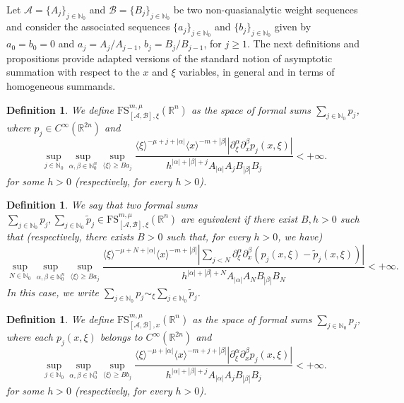 \documentclass[11pt,reqno]{amsart}
\numberwithin{equation}{section}
\newtheorem{definition}[theorem]{Definition}
\newcommand{\R}{{\mathbb{R}}} %
\newcommand{\N}{{\mathbb{N}}} %
\newcommand{\FS}{{\mathrm{FS}}}
\newcommand{\Aj}{{\{A_j\}_{j\in\mathbb{N}_0}}} %
\newcommand{\Bj}{{\{B_j\}_{j\in\mathbb{N}_0}}} %
\newcommand{\A}{{\mathcal{A}}} %
\newcommand{\B}{{\mathcal{B}}} %
\begin{document}
Let $\A=\Aj$ and $\B=\Bj$ be two non-quasianalytic weight sequences and consider the associated sequences $\{a_j\}_{j\in\N_0}$ and $\{b_j\}_{j\in\N_0}$ given by $a_0=b_0=0$ and $a_j=A_j/A_{j-1}$, $b_j=B_j/B_{j-1}$, for $j\geq 1$. The next definitions and propositions
provide adapted versions of the standard notion of asymptotic summation with respect to the $x$ and $\xi$ variables, in general and in terms of homogeneous
summands.


\begin{definition}\label{def:SGcl_xi}
	We define $\FS_{[\A,\B],\xi}^{m,\mu}(\R^n)$ as the space of formal sums $\sum_{j\in\N_0}p_j$, where $p_j\in C^\infty(\R^{2n})$ and
	\begin{equation*}
		\sup_{j\in\N_0}\sup_{\alpha,\beta\in\N_0^n}\sup_{\langle\xi\rangle \geq Ba_j} \frac{\langle\xi\rangle^{-\mu+j+|\alpha|}\langle x\rangle^{-m+|\beta|}|\partial_\xi^\alpha\partial_x^\beta p_j(x,\xi)|}{h^{|\alpha|+|\beta|+j} A_{|\alpha|}A_jB_{|\beta|}B_j} < +\infty.
	\end{equation*}
	for some $h>0$ (respectively, for every $h>0$).
\end{definition}
%
\begin{definition}\label{def:SGcl_xieq}
	We say that two formal sums $\sum_{j\in\N_0}p_j, \sum_{j\in\N_0}\tilde{p}_j \in \FS_{[\A,\B],\xi}^{m,\mu}(\R^n)$ are equivalent if there exist $B,h>0$ such that (respectively, there exists $B>0$ such that, for every $h>0$, we have)
	\begin{equation*}
		\sup_{N\in\N_0}\sup_{\alpha,\beta\in\N_0^n}\sup_{\langle\xi\rangle\geq Ba_j} \frac{\langle\xi\rangle^{-\mu+N+|\alpha|}\langle x\rangle^{-m+|\beta|} \left| \sum_{j<N}\partial_\xi^\alpha\partial_x^\beta(p_j(x,\xi)-\tilde{p}_j(x,\xi))\right|}{h^{|\alpha|+|\beta|+N} A_{|\alpha|}A_NB_{|\beta|}B_N} < +\infty.
	\end{equation*}
	In this case, we write $\sum_{j\in\N_0}p_j\sim_\xi \sum_{j\in\N_0}\tilde{p}_j$.
\end{definition}



\begin{definition}\label{def:SGcl_x}
	We define $\FS_{[\A,\B],x}^{m,\mu}(\R^n)$ as the space of formal sums $\sum_{j\in\N_0}p_j$, where each $p_j(x,\xi)$ belongs to $C^\infty(\R^{2n})$ and
	\begin{equation*}
		\sup_{j\in\N_0}\sup_{\alpha,\beta\in\N_0^n}\sup_{\langle\xi\rangle \geq Bb_j} \frac{\langle\xi\rangle^{-\mu+|\alpha|}\langle x\rangle^{-m+j+|\beta|}|\partial_\xi^\alpha\partial_x^\beta p_j(x,\xi)|}{h^{|\alpha|+|\beta|+j} A_{|\alpha|}A_jB_{|\beta|}B_j} < +\infty.
	\end{equation*}
	for some $h>0$ (respectively, for every $h>0$).
\end{definition}
\end{document}
